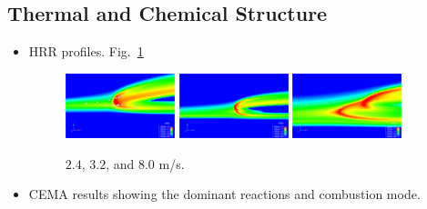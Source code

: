 \documentclass[11pt,english]{article}
\begin{document}
\subsection{Thermal and Chemical Structure}
\begin{itemize}
  \item HRR profiles.  Fig.~\ref{fig:HRR_velocity}
    \begin{figure}[t]
      \centering
      \scriptsize
      \includegraphics[width=0.3\textwidth]{HRR_2_4.png}
      \includegraphics[width=0.3\textwidth]{HRR_3_2.png}
      \includegraphics[width=0.3\textwidth]{HRR_8_0.png}
      \normalsize
      \caption{$2.4$, $3.2$, and $8.0$ m/s.}
      \label{fig:HRR_velocity}
    \end{figure} 
  \item CEMA results showing the dominant reactions and combustion mode.
\end{itemize}
\end{document}
